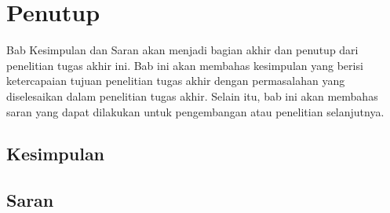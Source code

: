 \chapter{Penutup}

Bab Kesimpulan dan Saran akan menjadi bagian akhir dan penutup dari penelitian tugas akhir ini. Bab ini akan membahas kesimpulan yang berisi ketercapaian tujuan penelitian tugas akhir dengan permasalahan yang diselesaikan dalam penelitian tugas akhir. Selain itu, bab ini akan membahas saran yang dapat dilakukan untuk pengembangan atau penelitian selanjutnya.

\section{Kesimpulan}

\section{Saran}
